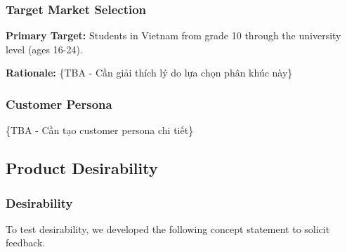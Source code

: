 \subsubsection{Target Market Selection}
\textbf{Primary Target:} Students in Vietnam from grade 10 through the university level (ages 16-24).

\textbf{Rationale:} \{TBA - Cần giải thích lý do lựa chọn phân khúc này\}

\subsubsection{Customer Persona}
\{TBA - Cần tạo customer persona chi tiết\}

\subsection{Product Desirability}
\subsubsection{Desirability}
To test desirability, we developed the following concept statement to solicit feedback.

\medskip

